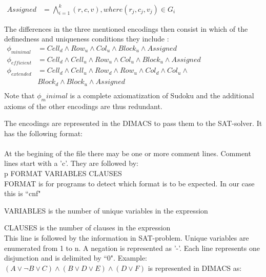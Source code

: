 \documentclass{article}
\begin{document}
$\begin{aligned}
Assigned &= \bigwedge^{k}_{i=1}(r,c,v),  where (r_j,c_j,v_j) \in G_i
\end{aligned}$

The differences in the three mentioned encodings then consist in which of the definedness and uniqueness conditions they include \cite{optimizedencoding}: \\

$\begin{aligned}
\phi_{minimal} &= Cell_{d} \wedge Row_{u} \wedge Col_{u} \wedge Block_{u} \wedge Assigned &\\
\phi_{efficient} &= Cell_{d} \wedge Cell_{u} \wedge Row_{u} \wedge Col_{u} \wedge Block_{u} \wedge Assigned &\\
\phi_{extended} &= Cell_{d} \wedge Cell_{u} \wedge Row_{d} \wedge Row_{u} \wedge Col_{d} \wedge Col_{u} \wedge &\\
& Block_{d} \wedge Block_{u} \wedge Assigned &\\
\end{aligned}$ \\

Note that $\phi_minimal$ is a complete axiomatization of Sudoku and the additional axioms of the other encodings are thus redundant.

The encodings are represented in the DIMACS to pass them to the SAT-solver. It has the following format:\\\\
At the begining of the file there may be one or more comment lines. Comment lines start with a 'c'. They are followed by: \\

p FORMAT VARIABLES CLAUSES  \\

FORMAT is for programs to detect which format is to be expected. In our case this is ``cnf"

VARIABLES is the number of unique variables in the expression

CLAUSES is the number of clauses in the expression\\

This line is followed by the information in SAT-problem. Unique variables are enumerated from 1 to n. A negation is represented as '-'. Each line represents one disjunction and is delimited by ``0". Example: $(A \vee \neg B \vee C)\wedge(B \vee D \vee E)\wedge(D \vee F)$ is represented in DIMACS as: \\
\end{document}
